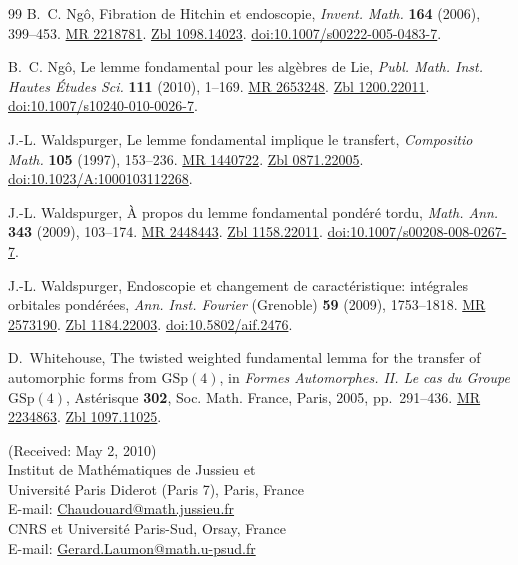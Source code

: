 \documentclass[12pt,a4paper,oneside,english,leqno]{smfart}
\numberwithin{equation}{subsection}
\numberwithin{theo}{subsection}
\theoremstyle{plain}
\theoremstyle{definition}
\theoremstyle{remark}
\begin{document}
\begin{thebibliography}{99}
 B.~C. Ng\^o, Fibration de Hitchin et endoscopie, \emph{Invent. Math.} \textbf{164} (2006), 399--453. \href{https://mathscinet.ams.org/mathscinet-getitem?mr=2218781}{MR 2218781}. \href{https://zbmath.org/?q=an:1098.14023}{Zbl 1098.14023}. \href{https://doi.org/10.1007/s00222-005-0483-7}{doi:10.1007/s00222-005-0483-7}.

 B.~C. Ng\^o, Le lemme fondamental pour les alg\`ebres de Lie, \emph{Publ. Math. Inst. Hautes \'Etudes Sci.} \textbf{111} (2010), 1--169. \href{https://mathscinet.ams.org/mathscinet-getitem?mr=2653248}{MR 2653248}. \href{https://zbmath.org/?q=an:1200.22011}{Zbl 1200.22011}. \href{https://doi.org/10.1007/s10240-010-0026-7}{doi:10.1007/s10240-010-0026-7}.

 J.-L. Waldspurger, Le lemme fondamental implique le transfert, \emph{Compositio Math.} \textbf{105} (1997), 153--236. \href{https://mathscinet.ams.org/mathscinet-getitem?mr=1440722}{MR 1440722}. \href{https://zbmath.org/?q=an:0871.22005}{Zbl 0871.22005}. \href{https://doi.org/10.1023/A:1000103112268}{doi:10.1023/A:1000103112268}.

 J.-L. Waldspurger, \`A propos du lemme fondamental pond\'er\'e tordu, \emph{Math. Ann.} \textbf{343} (2009), 103--174. \href{https://mathscinet.ams.org/mathscinet-getitem?mr=2448443}{MR 2448443}. \href{https://zbmath.org/?q=an:1158.22011}{Zbl 1158.22011}. \href{https://doi.org/10.1007/s00208-008-0267-7}{doi:10.1007/s00208-008-0267-7}.

 J.-L. Waldspurger, Endoscopie et changement de caract\'eristique: int\'egrales orbitales pond\'er\'ees, \emph{Ann. Inst. Fourier} (Grenoble) \textbf{59} (2009), 1753--1818. \href{https://mathscinet.ams.org/mathscinet-getitem?mr=2573190}{MR 2573190}. \href{https://zbmath.org/?q=an:1184.22003}{Zbl 1184.22003}. \href{https://doi.org/10.5802/aif.2476}{doi:10.5802/aif.2476}.

 D.~Whitehouse, The twisted weighted fundamental lemma for the transfer of automorphic forms from $\mathrm{GSp}(4)$, in \emph{Formes Automorphes. II. Le cas du Groupe} $\mathrm{GSp}(4)$, Ast\'erisque \textbf{302}, Soc. Math. France, Paris, 2005, pp.~291--436. \href{https://mathscinet.ams.org/mathscinet-getitem?mr=2234863}{MR 2234863}. \href{https://zbmath.org/?q=an:1097.11025}{Zbl 1097.11025}.

\end{thebibliography}

\bigskip
\begin{flushleft}\small
(Received: May 2, 2010)\\[1ex]
Institut de Math\'ematiques de Jussieu et\\
Universit\'e Paris Diderot (Paris 7), Paris, France\\
E-mail: \href{mailto:Chaudouard@math.jussieu.fr}{Chaudouard@math.jussieu.fr}\\[1ex]
CNRS et Universit\'e Paris-Sud, Orsay, France\\
E-mail: \href{mailto:Gerard.Laumon@math.u-psud.fr}{Gerard.Laumon@math.u-psud.fr}
\end{flushleft}
\end{document}
